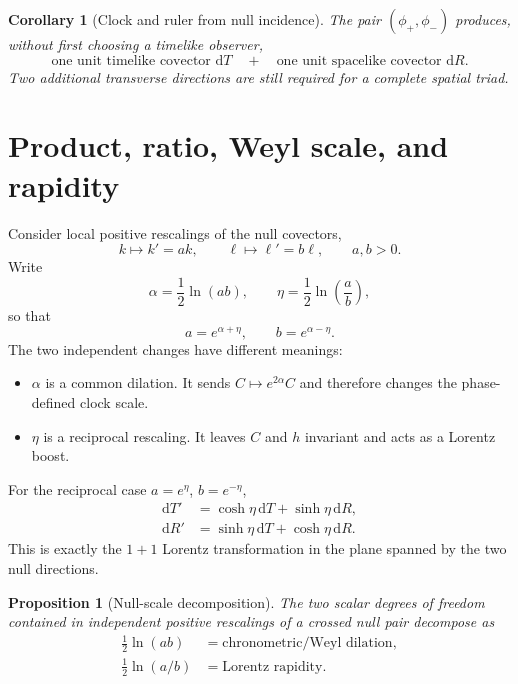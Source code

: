\documentclass[11pt,a4paper]{article}
\newtheorem{proposition}[definition]{Proposition}
\newtheorem{corollary}[definition]{Corollary}
\newcommand{\dd}{\mathrm{d}}
\newcommand{\Ccross}{C}
\begin{document}
\begin{corollary}[Clock and ruler from null incidence]
The pair $(\phi_+,\phi_-)$ produces, without first choosing a timelike observer,
\[
\boxed{
\text{one unit timelike covector }\dd T
\quad+\quad
\text{one unit spacelike covector }\dd R.
}
\]
Two additional transverse directions are still required for a complete spatial triad.
\end{corollary}

\section{Product, ratio, Weyl scale, and rapidity}

Consider local positive rescalings of the null covectors,
\[
k\mapsto k'=ak,
\qquad
\ell\mapsto\ell'=b\ell,
\qquad a,b>0.
\]
Write
\begin{equation}
\alpha=\frac12\ln(ab),
\qquad
\eta=\frac12\ln\left(\frac{a}{b}\right),
\label{eq:alphaeta}
\end{equation}
so that
\[
a=e^{\alpha+\eta},
\qquad
b=e^{\alpha-\eta}.
\]
The two independent changes have different meanings:

\begin{itemize}
  \item $\alpha$ is a common dilation. It sends $\Ccross\mapsto e^{2\alpha}\Ccross$ and therefore changes the phase-defined clock scale.
  \item $\eta$ is a reciprocal rescaling. It leaves $\Ccross$ and $h$ invariant and acts as a Lorentz boost.
\end{itemize}

For the reciprocal case $a=e^\eta$, $b=e^{-\eta}$,
\begin{align}
\dd T'&=\cosh\eta\,\dd T+\sinh\eta\,\dd R,\\
\dd R'&=\sinh\eta\,\dd T+\cosh\eta\,\dd R.
\end{align}
This is exactly the $1+1$ Lorentz transformation in the plane spanned by the two null directions.

\begin{proposition}[Null-scale decomposition]
The two scalar degrees of freedom contained in independent positive rescalings of a crossed null pair decompose as
\[
\boxed{
\begin{aligned}
\frac12\ln(ab)&=\text{chronometric/Weyl dilation},\\[1mm]
\frac12\ln(a/b)&=\text{Lorentz rapidity}.
\end{aligned}}
\]
\end{proposition}
\end{document}
